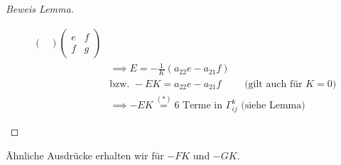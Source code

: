 \documentclass[../main.tex]{subfiles}
\begin{document}
\begin{proof}[Beweis Lemma]
\begin{recall}
\begin{align*}
\begin{pmatrix}
            \end{pmatrix} \begin{pmatrix}
                e&f\\f&g
            \end{pmatrix}\\
            &\implies E = -\frac{1}{K} (a_{22}e-a_{21}f)\\
            &\text{bzw. } -E K = a_{22}e-a_{21}f \qquad \text{ (gilt auch für } K=0 \text{)}\\
            &\implies -E K \overset{(*)}{=} 6 \text{ Terme in } \Gamma_{ij}^{k} \text{ (siehe Lemma)}
        \end{align*}
    \end{recall}
\end{proof}
\begin{remark}
    Ähnliche Ausdrücke erhalten wir für $-F K$ und $-G K$.
\end{remark}
\end{document}
